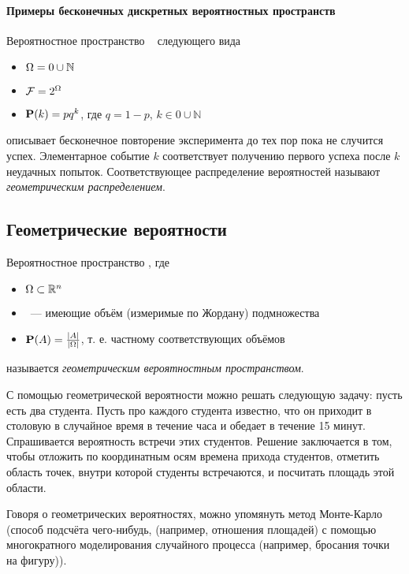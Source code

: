 \paragraph{Примеры бесконечных дискретных вероятностных пространств}

\begin{example}
	Вероятностное пространство \PSP~ следующего вида
	\begin{itemize}
		\item $\Omega = 0 \cup \mathbb N$
		\item $\mathcal{F} = 2^{\Omega}$
		\item $\mathbf{P}(k) = p q^k$, где $q = 1 - p$, $k \in 0 \cup \mathbb N$
	\end{itemize}
	описывает бесконечное повторение эксперимента до тех пор пока не случится успех. Элементарное событие $k$ соответствует получению первого успеха после $k$ неудачных попыток. Соответствующее распределение вероятностей называют {\it геометрическим распределением}.
\end{example}

\subsection{Геометрические вероятности}

\begin{definition}
Вероятностное пространство \PSP, где
\begin{itemize}
	\item $\Omega \subset \mathbb{R}^n$
	\item \Flg~--- имеющие объём (измеримые по Жордану) подмножества \oO
	\item $\mathbf{P}(A)=\frac{|A|}{|\Omega|}$, т. е. частному соответствующих объёмов
\end{itemize}
называется {\it геометрическим вероятностным пространством}.
\end{definition}

С помощью геометрической вероятности можно решать следующую задачу: пусть есть два студента. Пусть про каждого студента известно, что он приходит в столовую в случайное время в течение часа и обедает в течение 15 минут. Спрашивается вероятность встречи этих студентов. Решение заключается в том, чтобы отложить по координатным осям времена прихода студентов, отметить область точек, внутри которой студенты встречаются, и посчитать площадь этой области.

Говоря о геометрических вероятностях, можно упомянуть метод Монте-Карло (способ подсчёта чего-нибудь, (например, отношения площадей) с помощью многократного моделирования случайного процесса (например, бросания точки на фигуру)).
